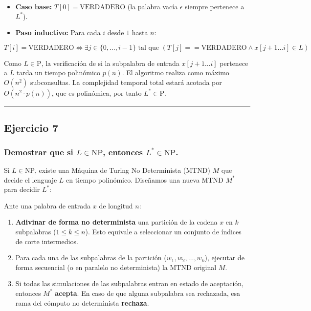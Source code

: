 \documentclass[12pt]{book} %
\providecommand{\tightlist}{%
  \setlength{\itemsep}{0pt}\setlength{\parskip}{0pt}}
\begin{document}
\begin{itemize}
\tightlist
\item
  \textbf{Caso base:} \(T[0] = \text{VERDADERO}\) (la palabra vacía
  \(\epsilon\) siempre pertenece a \(L^*\)).
\item
  \textbf{Paso inductivo:} Para cada \(i\) desde \(1\) hasta \(n\):
\end{itemize}

\[T[i] = \text{VERDADERO} \iff \exists j \in \{0, \dots, i-1\} \text{ tal que } (T[j] == \text{VERDADERO} \land x[j+1 \dots i] \in L)\]

Como \(L \in \text{P}\), la verificación de si la subpalabra de entrada
\(x[j+1 \dots i]\) pertenece a \(L\) tarda un tiempo polinómico
\(p(n)\). El algoritmo realiza como máximo \(O(n^2)\) subconsultas. La
complejidad temporal total estará acotada por \(O(n^2 \cdot p(n))\), que
es polinómica, por tanto \(L^* \in \text{P}\).

\begin{center}\rule{0.5\linewidth}{0.5pt}\end{center}

\hypertarget{ejercicio-7}{%
\subsection{Ejercicio 7}\label{ejercicio-7}}

\hypertarget{demostrar-que-si-l-in-textnp-entonces-l-in-textnp.}{%
\subsubsection{\texorpdfstring{Demostrar que si \(L \in \text{NP}\),
entonces
\(L^{*} \in \text{NP}\).}{Demostrar que si L \textbackslash in \textbackslash text\{NP\}, entonces L\^{}\{*\} \textbackslash in \textbackslash text\{NP\}.}}\label{demostrar-que-si-l-in-textnp-entonces-l-in-textnp.}}

Si \(L \in \text{NP}\), existe una Máquina de Turing No Determinista
(MTND) \(M\) que decide el lenguaje \(L\) en tiempo polinómico.
Diseñamos una nueva MTND \(M^*\) para decidir \(L^*\):

Ante una palabra de entrada \(x\) de longitud \(n\):

\begin{enumerate}
\def\labelenumi{\arabic{enumi}.}
\tightlist
\item
  \textbf{Adivinar de forma no determinista} una partición de la cadena
  \(x\) en \(k\) subpalabras (\(1 \le k \le n\)). Esto equivale a
  seleccionar un conjunto de índices de corte intermedios.
\item
  Para cada una de las subpalabras de la partición
  (\(w_1, w_2, \dots, w_k\)), ejecutar de forma secuencial (o en
  paralelo no determinista) la MTND original \(M\).
\item
  Si todas las simulaciones de las subpalabras entran en estado de
  aceptación, entonces \(M^*\) \textbf{acepta}. En caso de que alguna
  subpalabra sea rechazada, esa rama del cómputo no determinista
  \textbf{rechaza}.
\end{enumerate}
\end{document}
